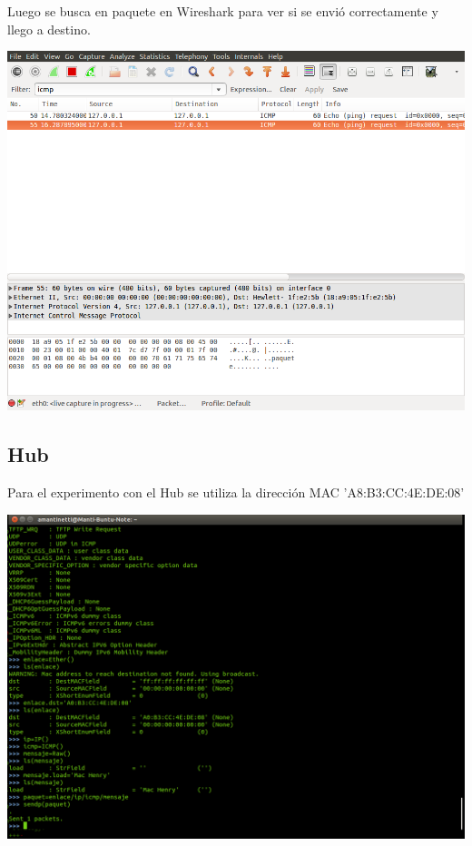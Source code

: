 \documentclass[spanish]{udpreport}
\begin{document}
Luego se busca en paquete en Wireshark para ver si se envió correctamente y llego a destino.

\begin{center}
	\includegraphics[scale=.37]{imagenes/Switch/Test_2_Wireshark.png}
\end{center}

\pagebreak

\subsection{Hub}

Para el experimento con el Hub se utiliza la dirección MAC 'A8:B3:CC:4E:DE:08'

\begin{center}
	\includegraphics[scale=.27]{imagenes/Hub/sendmanti.png}
	\\
\end{center}
\end{document}
